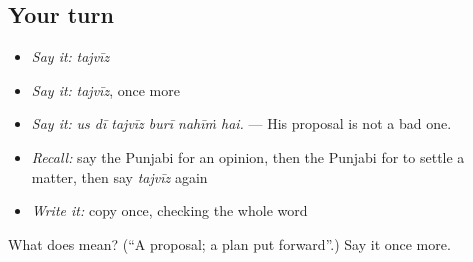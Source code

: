 \subsection*{Your turn}
\begin{itemize}
\raggedright
  \item \emph{Say it:} \emph{tajvīz}
  \item \emph{Say it:} \emph{tajvīz}, once more
  \item \emph{Say it:} \emph{us dī tajvīz burī nahīṁ hai.} — His proposal is not a bad one.
  \item \emph{Recall:} say the Punjabi for an opinion, then the Punjabi for to settle a matter, then say \emph{tajvīz} again
  \item \emph{Write it:} copy \textbf{} once, checking the whole word
\end{itemize}

\begin{tcolorbox}[breakable,colback=teal!4,colframe=teal!35!black,title={Before you move on}]
What does  mean? (\textquotedblleft{}A proposal; a plan put forward\textquotedblright{}.) Say it once more.
\end{tcolorbox}
